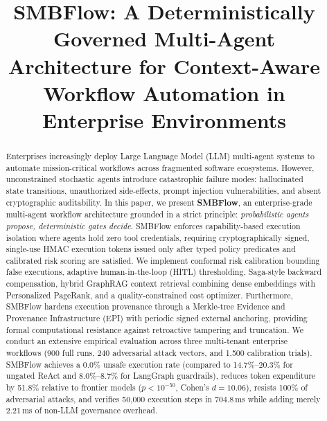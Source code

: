 \documentclass[conference]{IEEEtran}
\begin{document}
\title{SMBFlow: A Deterministically Governed Multi-Agent Architecture for Context-Aware Workflow Automation in Enterprise Environments}

\author{
}

\maketitle

\begin{abstract}
Enterprises increasingly deploy Large Language Model (LLM) multi-agent systems to automate mission-critical workflows across fragmented software ecosystems. However, unconstrained stochastic agents introduce catastrophic failure modes: hallucinated state transitions, unauthorized side-effects, prompt injection vulnerabilities, and absent cryptographic auditability. In this paper, we present \textbf{SMBFlow}, an enterprise-grade multi-agent workflow architecture grounded in a strict principle: \emph{probabilistic agents propose, deterministic gates decide}. SMBFlow enforces capability-based execution isolation where agents hold zero tool credentials, requiring cryptographically signed, single-use HMAC execution tokens issued only after typed policy predicates and calibrated risk scoring are satisfied. We implement conformal risk calibration bounding false executions, adaptive human-in-the-loop (HITL) thresholding, Saga-style backward compensation, hybrid GraphRAG context retrieval combining dense embeddings with Personalized PageRank, and a quality-constrained cost optimizer. Furthermore, SMBFlow hardens execution provenance through a Merkle-tree Evidence and Provenance Infrastructure (EPI) with periodic signed external anchoring, providing formal computational resistance against retroactive tampering and truncation. We conduct an extensive empirical evaluation across three multi-tenant enterprise workflows (900 full runs, 240 adversarial attack vectors, and 1,500 calibration trials). SMBFlow achieves a 0.0\% unsafe execution rate (compared to 14.7\%--20.3\% for ungated ReAct and 8.0\%--8.7\% for LangGraph guardrails), reduces token expenditure by 51.8\% relative to frontier models ($p < 10^{-50}$, Cohen's $d = 10.06$), resists 100\% of adversarial attacks, and verifies 50,000 execution steps in 704.8\,ms while adding merely 2.21\,ms of non-LLM governance overhead.
\end{abstract}
\end{document}
